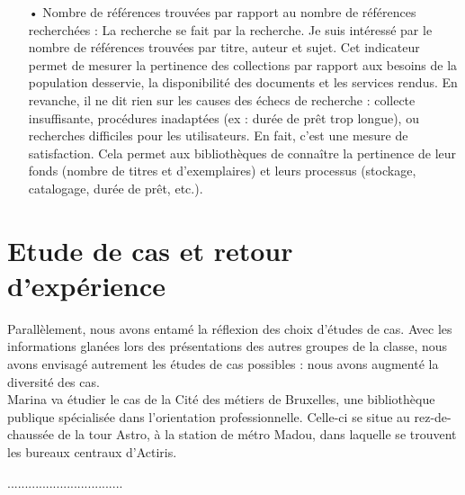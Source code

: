 \documentclass[french,a4paper,12pt]{article}
\begin{document}
\begin{enumerate}
\item[•]  Nombre de références trouvées par rapport au nombre de références recherchées : La recherche se fait par la recherche. Je suis intéressé par le nombre de références trouvées par titre, auteur et sujet. Cet indicateur permet de mesurer la pertinence des collections par rapport aux besoins de la population desservie, la disponibilité des documents et les services rendus. En revanche, il ne dit rien sur les causes des échecs de recherche : collecte insuffisante, procédures inadaptées (ex : durée de prêt trop longue), ou recherches difficiles pour les utilisateurs. En fait, c'est une mesure de satisfaction. Cela permet aux bibliothèques de connaître la pertinence de leur fonds (nombre de titres et d'exemplaires) et leurs processus (stockage, catalogage, durée de prêt, etc.). 

\end{enumerate}

\newpage
\section{Etude de cas et retour d'expérience}
\quad Parallèlement, nous avons entamé la réflexion des choix d’études de cas. Avec les informations glanées lors des présentations des autres groupes de la classe, nous avons envisagé autrement les études de cas possibles : nous avons augmenté la diversité des cas.\\ 

Marina va étudier le cas de la Cité des métiers de Bruxelles, une bibliothèque publique spécialisée dans l’orientation professionnelle. Celle-ci se situe au rez-de-chaussée de la tour Astro, à la station de métro Madou, dans laquelle se trouvent les bureaux centraux d’Actiris.

.................................\\
\end{document}

